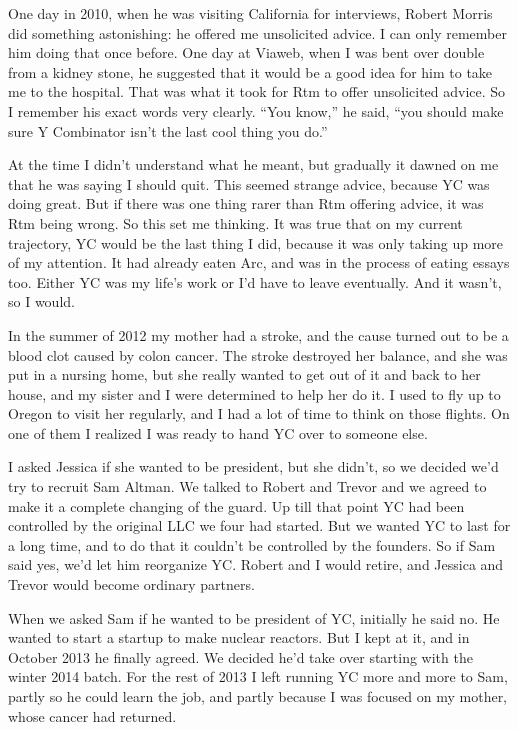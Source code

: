 \documentclass[12pt]{book}
\begin{document}
One day in 2010, when he was visiting California for interviews, Robert
Morris did something astonishing: he offered me unsolicited advice. I
can only remember him doing that once before. One day at Viaweb, when I
was bent over double from a kidney stone, he suggested that it would be
a good idea for him to take me to the hospital. That was what it took
for Rtm to offer unsolicited advice. So I remember his exact words very
clearly. ``You know,'' he said, ``you should make sure Y Combinator
isn't the last cool thing you do.''

At the time I didn't understand what he meant, but gradually it dawned
on me that he was saying I should quit. This seemed strange advice,
because YC was doing great. But if there was one thing rarer than Rtm
offering advice, it was Rtm being wrong. So this set me thinking. It was
true that on my current trajectory, YC would be the last thing I did,
because it was only taking up more of my attention. It had already eaten
Arc, and was in the process of eating essays too. Either YC was my
life's work or I'd have to leave eventually. And it wasn't, so I would.

In the summer of 2012 my mother had a stroke, and the cause turned out
to be a blood clot caused by colon cancer. The stroke destroyed her
balance, and she was put in a nursing home, but she really wanted to get
out of it and back to her house, and my sister and I were determined to
help her do it. I used to fly up to Oregon to visit her regularly, and I
had a lot of time to think on those flights. On one of them I realized I
was ready to hand YC over to someone else.

I asked Jessica if she wanted to be president, but she didn't, so we
decided we'd try to recruit Sam Altman. We talked to Robert and Trevor
and we agreed to make it a complete changing of the guard. Up till that
point YC had been controlled by the original LLC we four had started.
But we wanted YC to last for a long time, and to do that it couldn't be
controlled by the founders. So if Sam said yes, we'd let him reorganize
YC. Robert and I would retire, and Jessica and Trevor would become
ordinary partners.

When we asked Sam if he wanted to be president of YC, initially he said
no. He wanted to start a startup to make nuclear reactors. But I kept at
it, and in October 2013 he finally agreed. We decided he'd take over
starting with the winter 2014 batch. For the rest of 2013 I left running
YC more and more to Sam, partly so he could learn the job, and partly
because I was focused on my mother, whose cancer had returned.
\end{document}
